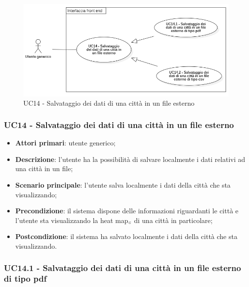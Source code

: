 \begin{center}
	\begin{figure}[H]
		\centering\includegraphics[scale=0.7]{../immagini/attori_casi/uc14.png}
		\caption{UC14 - Salvataggio dei dati di una città in un file esterno}
	\end{figure}
\end{center}


\subsubsection{UC14 - Salvataggio dei dati di una città in un file esterno}\label{CasiDUsoCasiDUsoFacoltativiTraUnUtenteEIlFrontEndElencoCasiDUsoUC14SalvataggioDeiDatiDiUnaCittaInUnFileEsterno}


\begin{itemize}
	\item \textbf{Attori primari}: utente generico;
	\item \textbf{Descrizione}: l’utente ha la possibilità di salvare localmente i dati relativi ad una città in un file;
	\item \textbf{Scenario principale}: l’utente salva localmente i dati della città che sta visualizzando;
	\item \textbf{Precondizione}: il sistema dispone delle informazioni riguardanti le città e  l’utente sta visualizzando la heat map$_{\scaleto{G}{3pt}}$ di una città in particolare;
	\item \textbf{Postcondizione}: il sistema ha salvato localmente i dati della città che sta visualizzando.
\end{itemize}

\subsubsection{UC14.1 - Salvataggio dei dati di una città in un file esterno di tipo pdf}\label{CasiDUsoCasiDUsoFacoltativiTraUnUtenteEIlFrontEndElencoCasiDUsoUC141SalvataggioDeiDatiDiUnaCittaInUnFileEsternoDiTipoPdf}

